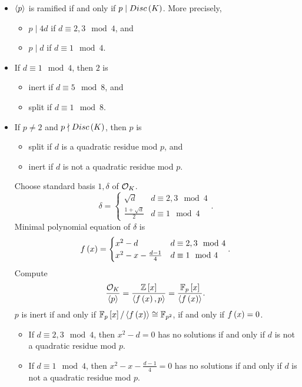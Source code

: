 \begin{itemize}
\item $ \left\langle p \right\rangle $ is ramified if and only if $ p \mid Disc\left( K \right) $. More precisely,
\begin{itemize}
\item $ p \mid 4d $ if $ d \equiv 2, 3 \mod 4 $, and
\item $ p \mid d $ if $ d \equiv 1 \mod 4 $.
\end{itemize}
\item If $ d \equiv 1 \mod 4 $, then $ 2 $ is
\begin{itemize}
\item inert if $ d \equiv 5 \mod 8 $, and
\item split if $ d \equiv 1 \mod 8 $.
\end{itemize}
\item If $ p \ne 2 $ and $ p \nmid Disc\left( K \right) $, then $ p $ is
\begin{itemize}
\item split if $ d $ is a quadratic residue mod $ p $, and
\item inert if $ d $ is not a quadratic residue mod $ p $.
\end{itemize}
Choose standard basis $ 1, \delta $ of $ \mathcal{O}_K $.
$$ \delta =
\begin{cases}
\sqrt{d} & d \equiv 2, 3 \mod 4 \\
\tfrac{1 + \sqrt{d}}{2} & d \equiv 1 \mod 4
\end{cases}.
$$
Minimal polynomial equation of $ \delta $ is
$$ f\left( x \right) =
\begin{cases}
x^2 - d & d \equiv 2, 3 \mod 4 \\
x^2 - x - \tfrac{d - 1}{4} & d \equiv 1 \mod 4
\end{cases}.
$$
Compute
$$ \dfrac{\mathcal{O}_K}{\left\langle p \right\rangle} = \dfrac{\mathbb{Z}\left[ x \right]}{\left\langle f\left( x \right), p \right\rangle} = \dfrac{\mathbb{F}_p\left[ x \right]}{\left\langle f\left( x \right) \right\rangle}. $$
$ p $ is inert if and only if $ \mathbb{F}_p\left[ x \right] / \left\langle f\left( x \right) \right\rangle \cong \mathbb{F}_{p^2} $, if and only if $ f\left( x \right) = 0 $.
\begin{itemize}
\item If $ d \equiv 2, 3 \mod 4 $, then $ x^2 - d = 0 $ has no solutions if and only if $ d $ is not a quadratic residue mod $ p $.
\item If $ d \equiv 1 \mod 4 $, then $ x^2 - x - \tfrac{d - 1}{4} = 0 $ has no solutions if and only if $ d $ is not a quadratic residue mod $ p $.
\end{itemize}
\end{itemize}

\pagebreak

